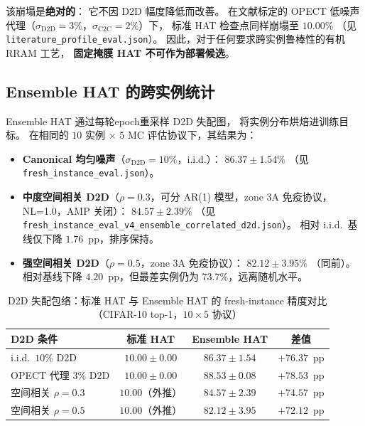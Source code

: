 该崩塌是\textbf{绝对的}：
它不因 D2D 幅度降低而改善。
在文献标定的 OPECT 低噪声代理（$\sigma_{\mathrm{D2D}}=3\%$，$\sigma_{\mathrm{C2C}}=2\%$）下，
标准 HAT 检查点同样崩塌至 $10.00\%$
（见 \texttt{literature\_profile\_eval.json}）。
因此，对于任何要求跨实例鲁棒性的有机 RRAM 工艺，
\textbf{固定掩膜 HAT 不可作为部署候选}。

\subsection{Ensemble HAT 的跨实例统计}

Ensemble HAT 通过每轮epoch重采样 D2D 失配图，
将实例分布烘焙进训练目标。
在相同的 $10$ 实例 $\times$ $5$ MC 评估协议下，其结果为：

\begin{itemize}
    \item \textbf{Canonical 均匀噪声}（$\sigma_{\mathrm{D2D}}=10\%$，i.i.d.）：
    $86.37\pm1.54\%$
    （见 \texttt{fresh\_instance\_eval.json}）。
    \item \textbf{中度空间相关 D2D}（$\rho=0.3$，可分 AR(1) 模型，zone 3A 免疫协议，NL=1.0，AMP 关闭）：
    $84.57\pm2.39\%$
    （见 \texttt{fresh\_instance\_eval\_v4\_ensemble\_correlated\_d2d.json}）。
    相对 i.i.d.~基线仅下降 $1.76$~pp，排序保持。
    \item \textbf{强空间相关 D2D}（$\rho=0.5$，zone 3A 免疫协议）：
    $82.12\pm3.95\%$
    （同前）。
    相对基线下降 $4.20$~pp，但最差实例仍为 $73.7\%$，远离随机水平。
\end{itemize}

\begin{table}[t]
\centering
\caption{D2D 失配包络：标准 HAT 与 Ensemble HAT 的 fresh-instance 精度对比（CIFAR-10 top-1，$10 \times 5$ 协议）}
\label{tab:d2d-envelope}
\small
\begin{tabular}{@{}lccc@{}}
\toprule
\textbf{D2D 条件} & \textbf{标准 HAT} & \textbf{Ensemble HAT} & \textbf{差值} \\
\midrule
i.i.d.~$10\%$ D2D & $10.00\pm0.00$ & $86.37\pm1.54$ & $+76.37$~pp \\
OPECT 代理 $3\%$ D2D & $10.00\pm0.00$ & $88.53\pm0.08$ & $+78.53$~pp \\
空间相关 $\rho=0.3$ & $10.00$（外推） & $84.57\pm2.39$ & $+74.57$~pp \\
空间相关 $\rho=0.5$ & $10.00$（外推） & $82.12\pm3.95$ & $+72.12$~pp \\
\bottomrule
\end{tabular}
\end{table}

